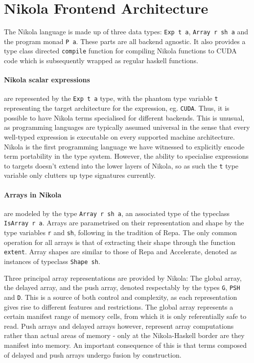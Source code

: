 \section{Nikola Frontend Architecture}



The Nikola language is made up of three data types: \texttt{Exp t a},
\texttt{Array r sh a} and the program monad \texttt{P a}. These parts are all
backend agnostic. It also provides a type class directed \texttt{compile}
function for compiling Nikola functions to CUDA code which is subsequently
wrapped as regular haskell functions.

\paragraph{Nikola scalar expressions} are represented by the \texttt{Exp t a} type, with
the phantom type variable \texttt{t} representing the target architecture for
the expression, eg.  \texttt{CUDA}. Thus, it is possible to have Nikola terms
specialised for different backends. This is unusual, as programming languages
are typically assumed universal in the sense that every well-typed expression
is executable on every supported machine architecture. Nikola is the first
programming language we have witnessed to explicitly encode term portability in
the type system. However, the ability to specialise expressions to targets
doesn't extend into the lower layers of Nikola, so as such the \texttt{t} type
variable only clutters up type signatures currently.

\paragraph{Arrays in Nikola} are modeled by the type \texttt{Array r sh a}, an associated
type of the typeclass \texttt{IsArray r a}. Arrays are parametrised on their
representation and shape by the type variables \texttt{r} and \texttt{sh},
following in the tradition of Repa. The only common operation for all arrays is
that of extracting their shape through the function \texttt{extent}. Array
shapes are similar to those of Repa and Accelerate, denoted as instances of
typeclass \texttt{Shape sh}.

Three principal array representations are provided by Nikola: The global array,
the delayed array, and the push array, denoted respectably by the types
\texttt{G}, \texttt{PSH} and \texttt{D}. This is a source of both control and
complexity, as each representation gives rise to different features and
restrictions. The global array represents a certain manifest range of memory
cells, from which it is only referentially safe to read. Push arrays and
delayed arrays however, represent array computations rather than actual areas
of memory - only at the Nikola-Haskell border are they manifest into memory. An
important consequence of this is that terms composed of delayed and push arrays
undergo fusion by construction.

